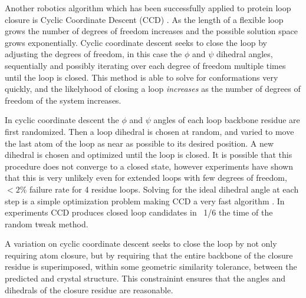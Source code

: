 Another robotics algorithm which has been successfully applied to protein loop closure is Cyclic Coordinate Descent (CCD) \cite{canutescu2003cyclic}.
As the length of a flexible loop grows the number of degrees of freedom increases and the possible solution space grows exponentially. 
Cyclic coordinate descent seeks to close the loop by adjusting the degrees of freedom, in this case the $\phi$ and $\psi$ dihedral angles, sequentially and possibly iterating over each degree of freedom multiple times until the loop is closed.
This method is able to solve for conformations very quickly, and the likelyhood of closing a loop {\it increases} as the number of degrees of freedom of the system increases.

In cyclic coordinate descent the $\phi$ and $\psi$ angles of each loop backbone residue are first randomized.
Then a loop dihedral is chosen at random, and varied to move the last atom of the loop as near as possible to its desired position.
A new dihedral is chosen and optimized until the loop is closed.
It is possible that this procedure does not converge to a closed state, however experiments have shown that this is very unlikely even for extended loops with few degrees of freedom, $ < 2\%$ failure rate for 4 residue loops.
Solving for the ideal dihedral angle at each step is a simple optimization problem making CCD a very fast algorithm \cite{wang1991combined,canutescu2003cyclic}.
In experiments CCD produces closed loop candidates in ~1/6 the time of the random tweak method.

A variation on cyclic coordinate descent seeks to close the loop by not only requiring atom closure, but by requiring that the entire backbone of the closure residue is superimposed, within some geometric similarity tolerance, between the predicted and crystal structure.
This constrainint ensures that the angles and dihedrals of the closure residue are reasonable\cite{canutescu2003cyclic}.
